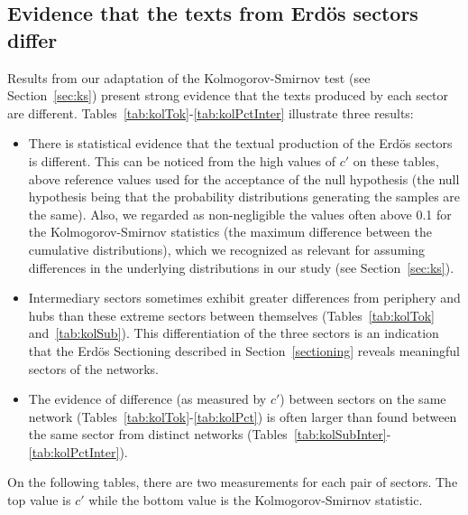 \subsection{Evidence that the texts from Erd\"os sectors differ}\label{subsec:di}
Results from our adaptation of the Kolmogorov-Smirnov test (see Section~\ref{sec:ks})
present strong evidence
that the texts produced by each sector are different.
Tables~\ref{tab:kolTok}-\ref{tab:kolPctInter}
illustrate three results:
\begin{itemize}
 \item There is statistical evidence that the textual production of the Erd\"os sectors is different.
	 This can be noticed from the high values of $c'$ on these tables, above reference values used for the acceptance of the null hypothesis (the null hypothesis being that the probability distributions generating the samples are the same). Also, we regarded as non-negligible the values often above 0.1 for the Kolmogorov-Smirnov statistics (the maximum difference between the cumulative distributions), which we recognized as relevant for assuming differences in the underlying distributions in our study (see Section~\ref{sec:ks}).
  \item Intermediary sectors sometimes exhibit greater differences 
from periphery and hubs than these extreme sectors between themselves 
(Tables~\ref{tab:kolTok} and~\ref{tab:kolSub}).
This differentiation of the three sectors is an indication that the Erd\"os Sectioning described in Section~\ref{sectioning} reveals meaningful sectors of the networks.
 \item The evidence of difference (as measured by $c'$) between sectors on the same network (Tables~\ref{tab:kolTok}-\ref{tab:kolPct}) is often larger than found between the same sector from distinct networks (Tables~\ref{tab:kolSubInter}-\ref{tab:kolPctInter}).
 \end{itemize}

 On the following tables, there are two measurements for each pair of sectors.
 The top value is $c'$ while the bottom value is the Kolmogorov-Smirnov statistic.
 
 
 

 
 
 
 

 \FloatBarrier
